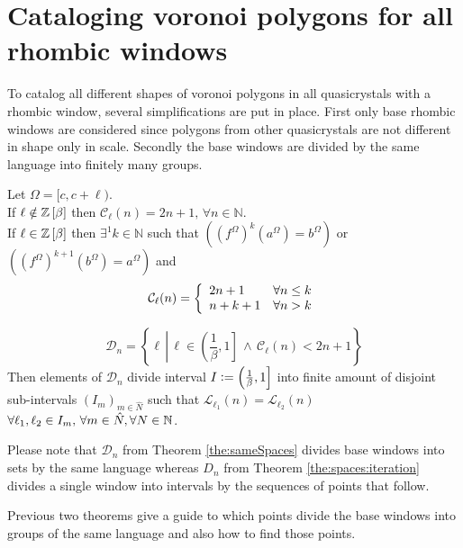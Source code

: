 \documentclass[text.tex]{subfiles}
\begin{document}
\section{Cataloging voronoi polygons for all rhombic windows}

To catalog all different shapes of voronoi polygons in all quasicrystals with a rhombic window, several simplifications are put in place.
First only base rhombic windows are considered since polygons from other quasicrystals are not different in shape only in scale. Secondly the base windows are divided by the same language into finitely many groups. 

\begin{theorem}
\label{the:complexity}
Let $\Omega = [c,c+\ell)$.\\
If $\ell \notin \mathbb{Z}\left[\beta\right]$ then $\mathcal{C}_{\ell}(n) = 2n+1,\, \forall n\in\mathbb{N}$. \\
If $\ell \in \mathbb{Z}\left[\beta\right]$ then $\exists^1 k \in \mathbb{N}$ such that $\left({(f^\Omega)}^{k}(a^\Omega) = b^\Omega\right)$ or $\left({(f^\Omega)}^{k+1}(b^\Omega) = a^\Omega\right)$ and 
$$\mathcal{C}_{\ell}(n) = \left\{
	\begin{array}{l l}
		2n+1	&	\forall n\leq k \\
		n+k+1	&	\forall n > k
	\end{array}
	\right.
$$
\end{theorem}

\begin{theorem}
\label{the:sameSpaces}
$$\mathcal{D}_n = \left\{ \ell\,\left|\, \ell\in \left(\frac{1}{\beta},1\right] \,\wedge\, \mathcal{C}_\ell(n) < 2n+1 \right.\right\}$$
Then elements of $\mathcal{D}_n$ divide interval $I \vcentcolon= \left(\frac{1}{\beta},1\right]$ into finite amount of disjoint sub-intervals $(I_m)_{m\in\widehat{N}}$ such that $\mathcal{L}_{\ell_1}(n) = \mathcal{L}_{\ell_2}(n)$ $\forall \ell_1, \ell_2 \in I_m,\, \forall m\in\hat{N}, \forall N\in\mathbb{N}$.
\end{theorem}

\begin{remark}
Please note that $\mathcal{D}_n$ from Theorem \ref{the:sameSpaces} divides base windows into sets by the same language whereas $D_n$ from Theorem \ref{the:spaces:iteration} divides a single window into intervals by the sequences of points that follow.
\end{remark}

Previous two theorems give a guide to which points divide the base windows into groups of the same language and also how to find those points. 
\end{document}
